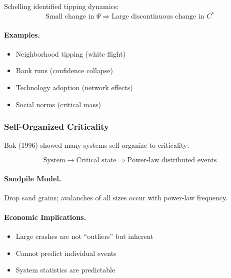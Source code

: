 Schelling identified tipping dynamics:
\begin{equation}
\text{Small change in } \Psi \Rightarrow \text{Large discontinuous change in } C^*
\end{equation}

\paragraph{Examples.}
\begin{itemize}
    \item Neighborhood tipping (white flight)
    \item Bank runs (confidence collapse)
    \item Technology adoption (network effects)
    \item Social norms (critical mass)
\end{itemize}

\subsubsection{Self-Organized Criticality}

Bak (1996) showed many systems self-organize to criticality:

\begin{equation}
\boxed{
\text{System} \to \text{Critical state} \Rightarrow \text{Power-law distributed events}
}
\label{eq:soc}
\end{equation}

\paragraph{Sandpile Model.}
Drop sand grains; avalanches of all sizes occur with power-law frequency.

\paragraph{Economic Implications.}
\begin{itemize}
    \item Large crashes are not ``outliers'' but inherent
    \item Cannot predict individual events
    \item System statistics are predictable
\end{itemize}

